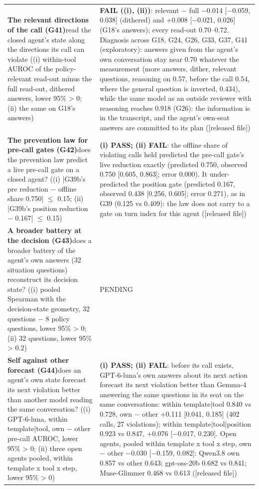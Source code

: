 {\begin{longtable}{p{}p{}}
\textbf{The relevant directions of the call (G41)}\newline read the closed agent's state along the directions its call can violate ((i) within-tool AUROC of the policy-relevant read-out minus the full read-out, dithered answers, lower 95\% > 0; (ii) the same on G18's answers) & \textbf{FAIL ((i), (ii))}: relevant $-$ full $-$0.014 [$-$0.059, 0.038] (dithered) and +0.008 [$-$0.021, 0.026] (G18's answers); every read-out 0.70--0.72. Diagnosis across G18, G24, G26, G33, G37, G41 (exploratory): answers given from the agent's own conversation stay near 0.70 whatever the measurement (more answers, dither, relevant questions, reasoning on 0.57, before the call 0.54, where the general question is inverted, 0.434), while the same model as an outside reviewer with reasoning reaches 0.918 (G26): the information is in the transcript, and the agent's own-seat answers are committed to its plan ([released file])\\[2pt]
\textbf{The prevention law for pre-call gates (G42)}\newline does the prevention law predict a live pre-call gate on a closed agent? ((i) |G39b's pre reduction $-$ offline share 0.750| $\leq$ 0.15; (ii) |G39b's position reduction $-$ 0.167| $\leq$ 0.15) & \textbf{(i) PASS; (ii) FAIL}: the offline share of violating calls held predicted the pre-call gate's live reduction exactly (predicted 0.750, observed 0.750 [0.605, 0.863]; error 0.000). It under-predicted the position gate (predicted 0.167, observed 0.438 [0.256, 0.605]; error 0.271), as in G39 (0.125 vs 0.409): the law does not carry to a gate on turn index for this agent ([released file])\\[2pt]
\textbf{A broader battery at the decision (G43)}\newline does a broader battery of the agent's own answers (32 situation questions) reconstruct its decision state? ((i) pooled Spearman with the decision-state geometry, 32 questions $-$ 8 policy questions, lower 95\% > 0; (ii) 32 questions, lower 95\% > 0.2) & PENDING\\[2pt]
\textbf{Self against other forecast (G44)}\newline does an agent's own state forecast its next violation better than another model reading the same conversation? ((i) GPT-6-luna, within template|tool, own $-$ other pre-call AUROC, lower 95\% > 0; (ii) three open agents pooled, within template x tool x step, lower 95\% > 0) & \textbf{(i) PASS; (ii) FAIL}: before its call exists, GPT-6-luna's own answers about its next action forecast its next violation better than Gemma-4 answering the same questions in its seat on the same conversations: within template|tool 0.840 vs 0.728, own $-$ other +0.111 [0.041, 0.185] (402 calls, 27 violations); within template|tool|position 0.923 vs 0.847, +0.076 [$-$0.017, 0.230]. Open agents, pooled within template x tool x step, own $-$ other $-$0.030 [$-$0.159, 0.082]: Qwen3.8 own 0.857 vs other 0.643; gpt-oss-20b 0.682 vs 0.841; Muse-Glimmer 0.468 vs 0.613 ([released file])\\[2pt]

\end{longtable}}
